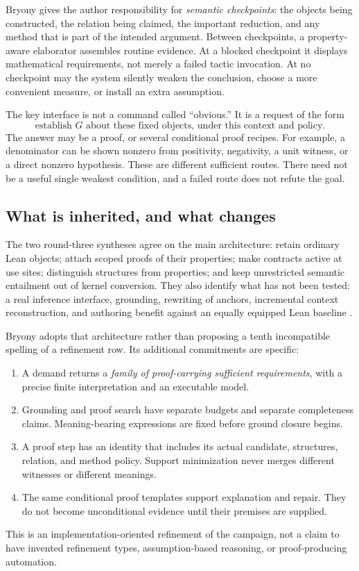 \documentclass[11pt,a4paper]{article}
\theoremstyle{definition}\newtheorem{definition}[theorem]{Definition}
\theoremstyle{remark}\newtheorem{remark}[theorem]{Remark}
\begin{document}
Bryony gives the author responsibility for \emph{semantic checkpoints}: the objects being constructed, the relation being claimed, the important reduction, and any method that is part of the intended argument. Between checkpoints, a property-aware elaborator assembles routine evidence. At a blocked checkpoint it displays mathematical requirements, not merely a failed tactic invocation. At no checkpoint may the system silently weaken the conclusion, choose a more convenient measure, or install an extra assumption.

The key interface is not a command called ``obvious.'' It is a request of the form
\[
 \text{establish }G\text{ about these fixed objects, under this context and policy}.
\]
The answer may be a proof, or several conditional proof recipes. For example, a denominator can be shown nonzero from positivity, negativity, a unit witness, or a direct nonzero hypothesis. These are different sufficient routes. There need not be a useful single weakest condition, and a failed route does not refute the goal.

\subsection{What is inherited, and what changes}
The two round-three syntheses agree on the main architecture: retain ordinary Lean objects; attach scoped proofs of their properties; make contracts active at use sites; distinguish structures from properties; and keep unrestricted semantic entailment out of kernel conversion. They also identify what has not been tested: a real inference interface, grounding, rewriting of anchors, incremental context reconstruction, and authoring benefit against an equally equipped Lean baseline \cite{synA,synB}.

Bryony adopts that architecture rather than proposing a tenth incompatible spelling of a refinement row. Its additional commitments are specific:
\begin{enumerate}
\item A demand returns a \emph{family of proof-carrying sufficient requirements}, with a precise finite interpretation and an executable model.
\item Grounding and proof search have separate budgets and separate completeness claims. Meaning-bearing expressions are fixed before ground closure begins.
\item A proof step has an identity that includes its actual candidate, structures, relation, and method policy. Support minimization never merges different witnesses or different meanings.
\item The same conditional proof templates support explanation and repair. They do not become unconditional evidence until their premises are supplied.
\end{enumerate}
This is an implementation-oriented refinement of the campaign, not a claim to have invented refinement types, assumption-based reasoning, or proof-producing automation.
\end{document}
